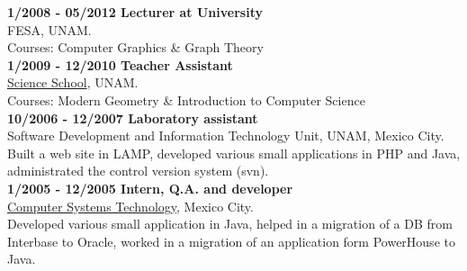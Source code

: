 \documentclass[letterpaper,10pt]{article}
\begin{document}
\begin{minipage}{0.5\textwidth}
\textbf{1/2008 - 05/2012 Lecturer at University} \\
FESA, UNAM. \\
Courses: Computer Graphics \& Graph Theory \\

\textbf{1/2009 - 12/2010 Teacher Assistant} \\
\href{http://www.fciencias.unam.mx/}{Science School}, UNAM. \\
Courses: Modern Geometry \& Introduction to Computer Science \\

\textbf{10/2006 - 12/2007 Laboratory assistant} \\
Software Development and Information Technology Unit, UNAM, Mexico City. \\
Built a web site in LAMP, developed various small applications in PHP and Java, administrated the control version system (svn). \\

\textbf{1/2005 - 12/2005 Intern, Q.A. and developer} \\
\href{http://www.tsc.com.mx/}{Computer Systems Technology}, Mexico City. \\
Developed various small application in Java, helped in a migration of a DB from Interbase to Oracle, worked in a migration of an application form PowerHouse to Java. \\

\end{minipage}
%
\hspace{0.05\textwidth}
%
\end{document}
